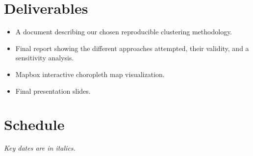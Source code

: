 \documentclass[11pt, a4paper]{article}
\begin{document}
\section*{Deliverables}

\begin{itemize}
\item A document describing our chosen reproducible clustering methodology.
\item Final report showing the different approaches attempted, their validity, and a sensitivity analysis. 
\item Mapbox interactive choropleth map visualization. 
\item Final presentation slides. 
\end{itemize}




\pagebreak 
\section*{Schedule}

\textit{Key dates are in italics.}
\end{document}
